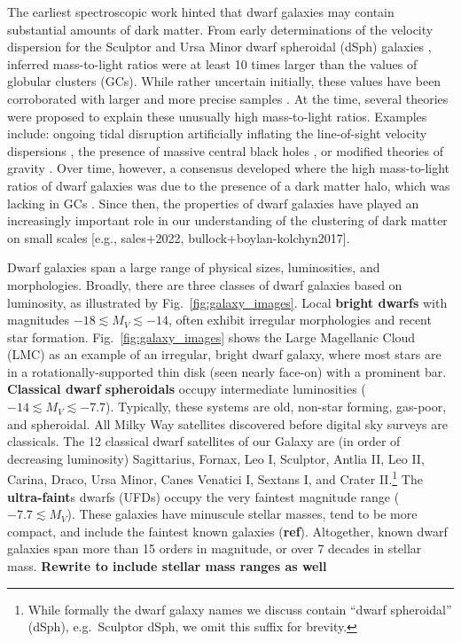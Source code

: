 The earliest spectroscopic work hinted that dwarf galaxies may contain
substantial amounts of dark matter. From early determinations of the
velocity dispersion for the Sculptor and Ursa Minor dwarf spheroidal
(dSph) galaxies \citep[e.g.,][]{aaronson1983, aaronson+olszewski1987},
inferred mass-to-light ratios were at least 10 times larger than the
values of globular clusters (GCs). While rather uncertain initially,
these values have been corroborated with larger and more precise samples
\citep[e.g.,][]{hargreaves+1994}. At the time, several theories were
proposed to explain these unusually high mass-to-light ratios. Examples
include: ongoing tidal disruption artificially inflating the
line-of-sight velocity dispersions \citep[e.g.,][]{kuhn+miller1989}, the
presence of massive central black holes
\citep[e.g.,][]{strobel+lake1994}, or modified theories of gravity
\citep{milgrom1995}. Over time, however, a consensus developed where the
high mass-to-light ratios of dwarf galaxies was due to the presence of a
dark matter halo, which was lacking in GCs
\citep[e.g.,][\textbf{REFS}]{dekel+silk1986}. Since then, the properties
of dwarf galaxies have played an increasingly important role in our
understanding of the clustering of dark matter on small scales {[}e.g.,
sales+2022, bullock+boylan-kolchyn2017{]}.

Dwarf galaxies span a large range of physical sizes, luminosities, and
morphologies. Broadly, there are three classes of dwarf galaxies based
on luminosity, as illustrated by Fig.~\ref{fig:galaxy_images}. Local
\textbf{bright dwarfs} with magnitudes
\(-18 \lesssim M_V \lesssim  -14\), often exhibit irregular morphologies
and recent star formation. Fig.~\ref{fig:galaxy_images} shows the Large
Magellanic Cloud (LMC) as an example of an irregular, bright dwarf
galaxy, where most stars are in a rotationally-supported thin disk (seen
nearly face-on) with a prominent bar. \textbf{Classical dwarf
spheroidals} occupy intermediate luminosities (
\(-14 \lesssim M_V  \lesssim -7.7\)). Typically, these systems are old,
non-star forming, gas-poor, and spheroidal. All Milky Way satellites
discovered before digital sky surveys are classicals. The 12 classical
dwarf satellites of our Galaxy are (in order of decreasing luminosity)
Sagittarius, Fornax, Leo I, Sculptor, Antlia II, Leo II, Carina, Draco,
Ursa Minor, Canes Venatici I, Sextans I, and Crater II.\footnote{While
  formally the dwarf galaxy names we discuss contain ``dwarf
  spheroidal'' (dSph), e.g.~Sculptor dSph, we omit this suffix for
  brevity.} The \textbf{ultra-faint}s dwarfs (UFDs) occupy the very
faintest magnitude range (\(-7.7 \lesssim M_V\)). These galaxies have
minuscule stellar masses, tend to be more compact, and include the
faintest known galaxies (\textbf{ref}). Altogether, known dwarf galaxies
span more than 15 orders in magnitude, or over 7 decades in stellar
mass. \textbf{Rewrite to include stellar mass ranges as well}

